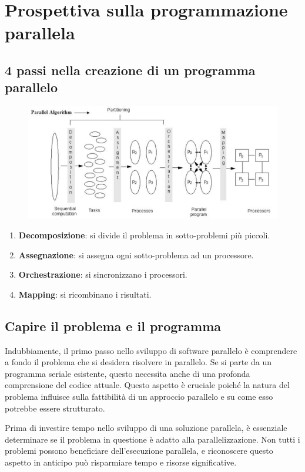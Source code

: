 \chapter{Prospettiva sulla programmazione parallela}
\section{4 passi nella creazione di un programma parallelo}
\begin{figure}[H]
    \centering 
    \includegraphics[scale=0.5]{img/4steps.png}
\end{figure}
\begin{enumerate}
    \item \textbf{Decomposizione}: si divide il
    problema in sotto-problemi
    più piccoli.
    \item \textbf{Assegnazione}: si assegna ogni
    sotto-problema ad un 
    processore.
    \item \textbf{Orchestrazione}: si sincronizzano i processori.
    \item \textbf{Mapping}: si ricombinano i risultati.
\end{enumerate}

\section{Capire il problema e il programma}
Indubbiamente, il primo passo nello sviluppo di software
parallelo è comprendere a fondo il problema che si desidera
risolvere in parallelo. Se si parte da un programma
seriale esistente, questo necessita anche di una profonda
comprensione del codice attuale. Questo aspetto è cruciale
poiché la natura del problema influisce sulla fattibilità
di un approccio parallelo e su come esso potrebbe essere
strutturato.

Prima di investire tempo nello sviluppo di una soluzione
parallela, è essenziale determinare se il problema
in questione è adatto alla parallelizzazione.
Non tutti i problemi possono beneficiare dell'esecuzione
parallela, e riconoscere questo aspetto in anticipo
può risparmiare tempo e risorse significative.

